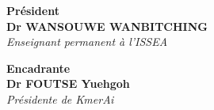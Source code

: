 \documentclass[12pt,twoside]{report}
\begin{document}
\begin{titlepage}
\begin{minipage}[t]{0.33\textwidth}
\begin{center}
\textbf{Président}\\[0.04cm]
\textbf{Dr WANSOUWE WANBITCHING}\\[0.03cm]
\textit{Enseignant permanent à l'ISSEA}
\end{center}
\end{minipage}%
\begin{minipage}[t]{0.33\textwidth}
\begin{center}
\textbf{Encadrante}\\[0.04cm]
\textbf{Dr FOUTSE Yuehgoh}\\[0.03cm]
\textit{Présidente de KmerAi}
\end{center}
\end{minipage}
\vfill
\begin{center}
    \tcbox[colback=midblue, colframe=midblue, boxrule=0.8pt, arc=1mm, left=3mm, right=3mm, top=1mm, bottom=1mm]{\normalsize\textbf{\textcolor{white}{Session de Juillet 2026}}}
\end{center}
\normalsize
\end{titlepage}
\end{document}
